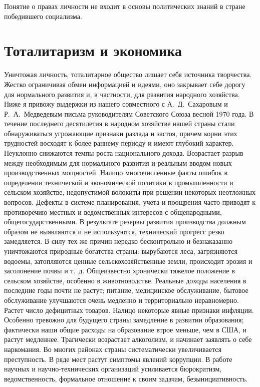 \documentclass{book}
\begin{document}
Понятие о правах личности не входит в основы политических знаний в стране победившего социализма.



\section{Тоталитаризм и экономика}

Уничтожая личность, тоталитарное общество лишает себя источника творчества. Жестко ограничивая обмен информацией и идеями, оно 
закрывает себе дорогу для нормального раз­вития и, в частности, для развития народного хозяйства. Ниже я привожу выдержки из 
нашего совместного с А.~Д.~Сахаровым и Р.~А.~Медведевым письма руководителям Советского Союза весной 1970 года.
В течение последнего десятилетия в народном хозяйстве нашей страны стали обнаруживаться угрожающие признаки разлада и застоя, 
причем корни этих трудностей восходят к более раннему периоду и имеют глубокий характер. Неуклонно снижаются темпы роста 
национального дохода. Возрастает разрыв между необходимым для нормального развития и реаль­ным вводом новых производственных 
мощностей. Налицо многочисленные факты ошибок в определении технической и экономической политики в промышленности и сельском 
хозяйстве, недопустимой волокиты при решении некоторых неотложных вопросов. Дефекты в системе планирования, учета и поощрения 
часто приводят к противоречию местных и ведомственных интересов с общенародными, общегосударственными. В результате резервы 
развития производства должным образом не выявляются и не используются, технический прогресс резко замедляется. В силу тех же 
причин нередко бесконтрольно и безнаказанно уничтожаются природные богатства страны: вырубаются леса, загрязняются водоемы, 
затопляются ценные сельскохозяйственные земли, происходит эрозия и засолонение почвы и т.~д. Общеизвестно хронически тяжелое 
положение в сельском хозяйстве, особенно в животноводстве. Реальные до­ходы населения в последние годы почти не растут; питание, 
медицинское обслуживание, бытовое обслуживание улучшаются очень медленно и территориально неравномерно. Растет чис­ло дефицитных 
товаров. Налицо некоторые явные признаки инфляции. Особенно тревожно для будущего страны замедление в развитии образования; 
фактически наши общие расходы на образование втрое меньше, чем в США, и растут медленнее. Трагически возрастает алкоголизм, и 
начинает заявлять о себе наркомания. Во многих районах страны систематически увеличивается преступность. В ряде мест растут 
симптомы явлений коррупции. В работе научных и научно-технических организаций усиливается бюрократизм, ведомственность, 
формальное отношение к своим задачам, безынициативность.
\end{document}
